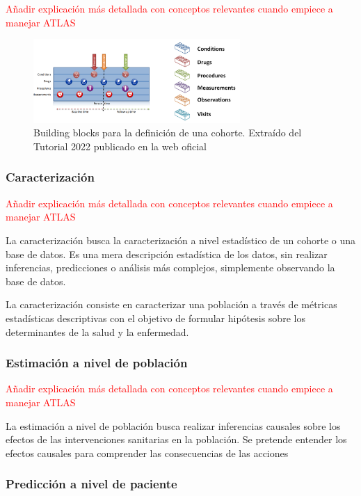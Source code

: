 \textcolor{red}{Añadir explicación más detallada con conceptos relevantes cuando empiece a manejar ATLAS}

\begin{figure}[H]
\centering
\includegraphics[width=0.70\textwidth]{figures/bblocksPatientJourney.png}
     \caption{Building blocks para la definición de una cohorte. Extraído del Tutorial 2022 publicado en la web oficial \cite{OHDSIwebsite}}
    \label{fig:bblocksPatientJourney}
\end{figure}


\subsubsection{Caracterización}

\textcolor{red}{Añadir explicación más detallada con conceptos relevantes cuando empiece a manejar ATLAS}

La caracterización busca la caracterización a nivel estadístico de un cohorte o una base de datos. Es una mera descripción estadística de los datos, sin realizar inferencias, predicciones o análisis más complejos, simplemente observando la base de datos.

La caracterización consiste en caracterizar una población a través de métricas estadísticas descriptivas con el objetivo de formular hipótesis sobre los determinantes de la salud y la enfermedad.

\subsubsection{Estimación a nivel de población}

\textcolor{red}{Añadir explicación más detallada con conceptos relevantes cuando empiece a manejar ATLAS}

La estimación a nivel de población busca realizar inferencias causales sobre los efectos de las intervenciones sanitarias en la población. Se pretende entender los efectos causales para comprender las consecuencias de las acciones

\subsubsection{Predicción a nivel de paciente}

